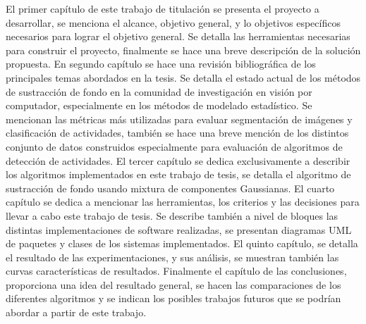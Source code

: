 El primer capítulo de este trabajo de titulación se presenta el proyecto a desarrollar, se menciona el alcance, objetivo general, y lo objetivos específicos necesarios para lograr el objetivo general. Se detalla las herramientas necesarias para construir el proyecto, finalmente se hace una breve descripción de la solución propuesta. En segundo capítulo se hace una revisión bibliográfica de los principales temas abordados en la tesis. Se detalla el estado actual de los métodos de sustracción de fondo en la comunidad de investigación en visión por computador, especialmente en los métodos de modelado estadístico. Se mencionan las métricas más utilizadas para evaluar segmentación de imágenes y clasificación de actividades, también se hace una breve mención de los distintos conjunto de datos construidos especialmente para evaluación de algoritmos de detección de actividades. El tercer capítulo se dedica exclusivamente a describir los algoritmos implementados en este trabajo de tesis, se detalla el algoritmo de sustracción de fondo usando mixtura de componentes Gaussianas. El cuarto capítulo se dedica a mencionar las herramientas, los criterios y las decisiones para llevar a cabo este trabajo de tesis. Se describe también a nivel de bloques las distintas implementaciones de software realizadas, se presentan diagramas UML de paquetes y clases de los sistemas implementados. El quinto capítulo, se detalla el resultado de las experimentaciones, y sus análisis, se muestran también las curvas características de resultados. Finalmente el capítulo de las conclusiones, proporciona una idea del resultado general, se hacen las comparaciones de los diferentes algoritmos y se indican los posibles trabajos futuros que se podrían abordar a partir de este trabajo.



